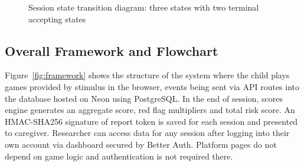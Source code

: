 \documentclass[12pt,a4paper,oneside]{report}
\begin{document}
\begin{figure}[b]
  \centering
  \caption{Session state transition diagram: three states with two terminal accepting states}
  \label{fig:state}
\end{figure}

\subsection{Overall Framework and Flowchart}

Figure~\ref{fig:framework} shows the structure of the system where the child plays games provided by stimulus in the browser, events being sent via API routes into the database hosted on Neon using PostgreSQL. In the end of session, scores engine generates an aggregate score, red flag multipliers and total risk score. An HMAC-SHA256 signature of report token is saved for each session and presented to caregiver. Researcher can access data for any session after logging into their own account via dashboard secured by Better Auth. Platform pages do not depend on game logic and authentication is not required there.
\end{document}
